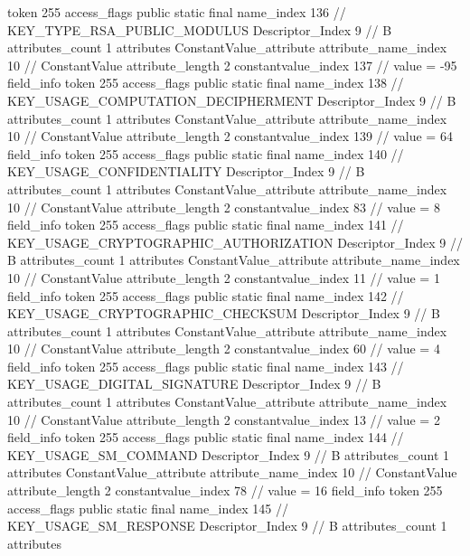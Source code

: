 {{{{{				token	255
				access_flags	public static final
				name_index	136		// KEY_TYPE_RSA_PUBLIC_MODULUS
				Descriptor_Index	9		// B
				attributes_count	1
				attributes {
				ConstantValue_attribute {
					attribute_name_index	10		// ConstantValue
					attribute_length	2
					constantvalue_index	137		// value = -95
				}
				}
			}
			field_info {
				token	255
				access_flags	public static final
				name_index	138		// KEY_USAGE_COMPUTATION_DECIPHERMENT
				Descriptor_Index	9		// B
				attributes_count	1
				attributes {
				ConstantValue_attribute {
					attribute_name_index	10		// ConstantValue
					attribute_length	2
					constantvalue_index	139		// value = 64
				}
				}
			}
			field_info {
				token	255
				access_flags	public static final
				name_index	140		// KEY_USAGE_CONFIDENTIALITY
				Descriptor_Index	9		// B
				attributes_count	1
				attributes {
				ConstantValue_attribute {
					attribute_name_index	10		// ConstantValue
					attribute_length	2
					constantvalue_index	83		// value = 8
				}
				}
			}
			field_info {
				token	255
				access_flags	public static final
				name_index	141		// KEY_USAGE_CRYPTOGRAPHIC_AUTHORIZATION
				Descriptor_Index	9		// B
				attributes_count	1
				attributes {
				ConstantValue_attribute {
					attribute_name_index	10		// ConstantValue
					attribute_length	2
					constantvalue_index	11		// value = 1
				}
				}
			}
			field_info {
				token	255
				access_flags	public static final
				name_index	142		// KEY_USAGE_CRYPTOGRAPHIC_CHECKSUM
				Descriptor_Index	9		// B
				attributes_count	1
				attributes {
				ConstantValue_attribute {
					attribute_name_index	10		// ConstantValue
					attribute_length	2
					constantvalue_index	60		// value = 4
				}
				}
			}
			field_info {
				token	255
				access_flags	public static final
				name_index	143		// KEY_USAGE_DIGITAL_SIGNATURE
				Descriptor_Index	9		// B
				attributes_count	1
				attributes {
				ConstantValue_attribute {
					attribute_name_index	10		// ConstantValue
					attribute_length	2
					constantvalue_index	13		// value = 2
				}
				}
			}
			field_info {
				token	255
				access_flags	public static final
				name_index	144		// KEY_USAGE_SM_COMMAND
				Descriptor_Index	9		// B
				attributes_count	1
				attributes {
				ConstantValue_attribute {
					attribute_name_index	10		// ConstantValue
					attribute_length	2
					constantvalue_index	78		// value = 16
				}
				}
			}
			field_info {
				token	255
				access_flags	public static final
				name_index	145		// KEY_USAGE_SM_RESPONSE
				Descriptor_Index	9		// B
				attributes_count	1
				attributes {
}}}}}}
